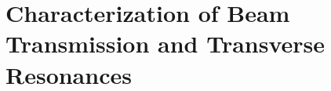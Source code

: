 \renewcommand{\thechapter}{5}

\chapter{Characterization of Beam Transmission and Transverse Resonances}
\label{ch:res}
